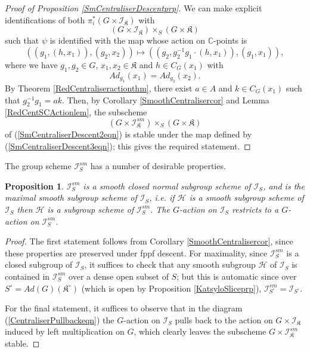 \documentclass{amsart}
\newtheorem{proposition}[theorem]{Proposition}
\theoremstyle{remark}
\numberwithin{theorem}{section}
\numberwithin{equation}{section}
\begin{document}
\begin{proof}[Proof of Proposition \ref{SmCentraliserDescentprp}]
We can make explicit identifications of both $\pi_i^*(G \times \mathcal I_{\mathfrak{K}})$ with
\begin{equation}\label{SmCentraliserDescent2eqn}
    (G \times \mathcal I_{\mathfrak{K}}) \times _S (G \times \mathfrak{K})
\end{equation}
such that $\psi$ is identified with the map whose action on $\mathbb{C}$-points is
\begin{equation}\label{SmCentraliserDescent3eqn}
    ((g_1,(h,x_1)),(g_2,x_2)) \mapsto ((g_2, g_2^{-1}g_1 \cdot (h,x_1)),(g_1,x_1)),
\end{equation}
where we have $g_1,g_2 \in G$, $x_1,x_2 \in \mathfrak{K}$ and $h \in C_G(x_1)$ with
\begin{equation}\label{SmCentraliserDescent4eqn}
    Ad_{g_1}(x_1)=Ad_{g_2}(x_2).
\end{equation}
By Theorem \ref{RedCentraliseractionthm}, there exist $a \in A$ and $k \in C_G(x_1)$ such that $g_2^{-1}g_1 = ak$. Then, by Corollary \ref{SmoothCentralisercor} and Lemma \ref{RedCentSCActionlem}, the subscheme
\begin{equation}\label{SmCentraliserDescent5eqn}
    (G \times \mathcal I_{\mathfrak{K}}^{sm}) \times _S (G \times \mathfrak{K})
\end{equation}
of (\ref{SmCentraliserDescent2eqn}) is stable under the map defined by (\ref{SmCentraliserDescent3eqn}); this gives the required statement.
\end{proof}

The group scheme $\mathcal I_S^{sm}$ has a number of desirable properties.

\begin{proposition}\label{SmCentraliserPropsprp}
    $\mathcal I_S^{sm}$ is a smooth closed normal subgroup scheme of $\mathcal I_S$, and is the maximal smooth subgroup scheme of $\mathcal I_S$, i.e. if $\mathcal H$ is a smooth subgroup scheme of $\mathcal I_S$ then $\mathcal H$ is a subgroup scheme of $\mathcal I^{sm}_S$. The $G$-action on $\mathcal I_S$ restricts to a $G$-action on $\mathcal I_S^{sm}$. 
\end{proposition}

\begin{proof}
The first statement follows from Corollary \ref{SmoothCentralisercor}, since these properties are preserved under fppf descent. For maximality, since $\mathcal I_S^{sm}$ is a closed subgroup of $\mathcal I_S$, it suffices to check that any smooth subgroup $\mathcal H$ of $\mathcal I_S$ is contained in $\mathcal I_S^{sm}$ over a dense open subset of $S$; but this is automatic since over $S^\circ = Ad(G)(\mathfrak{K}^\circ)$ (which is open by Proposition \ref{KatsyloSliceprp}), $\mathcal I^{sm}_{S^\circ} = \mathcal I_{S^\circ}$. 

For the final statement, it suffices to observe that in the diagram (\ref{CentraliserPullbackeqn}) the $G$-action on $\mathcal I_S$ pulls back to the action on $G \times \mathcal I_{\mathfrak{K}}$ induced by left multiplication on $G$, which clearly leaves the subscheme $G \times \mathcal I_{\mathfrak{K}}^{sm}$ stable.
\end{proof}
\end{document}
